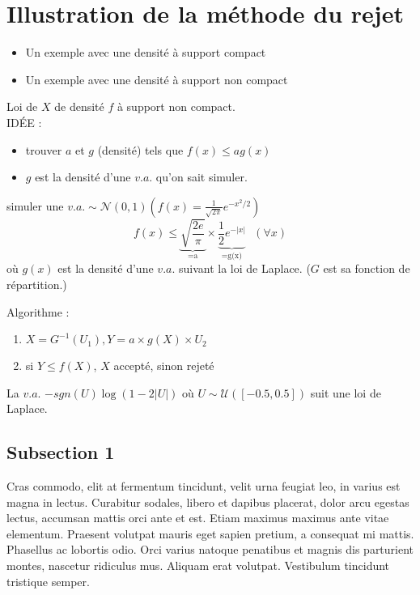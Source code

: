 \section{Illustration de la méthode du rejet}

\begin{itemize}
    \item Un exemple avec une densité à support compact
    \item  Un exemple avec une densité à support non compact
\end{itemize}
Loi de $X$ de densité $f$ à support non compact.\\
\uppercase{Idée :}
\begin{itemize}
    \item trouver $a$ et $g$ (densité) tels que $f(x)\leq ag(x)$
    \item $g$ est la densité d'une $v.a.$ qu'on sait simuler.
\end{itemize}

\begin{example}
    simuler une $v.a. \sim \mathcal{N}(0,1) (f(x)=\frac{1}{\sqrt{2\pi}}e^{-x^2/2})$
    $$f(x)\leq\underbrace{\sqrt{\frac{2e}{\pi}}}_\text{=a} \times
    \underbrace{\frac{1}{2}e^{-|x|}}_\text{=g(x)} \text{   } (\forall x)$$
    où $g(x)$ est la densité d’une $v.a.$ suivant la loi de Laplace.
    ($G$ est sa fonction de répartition.)
\end{example}

Algorithme :
\begin{enumerate}
    \item $X=G^{-1}(U_1), Y=a\times g(X)\times U_{2}$
    \item si $Y\leq f(X)$, $X$ accepté, sinon rejeté
\end{enumerate}
La $v.a.$
$-sgn(U)\log(1-2|U|) \text{  où  } U\sim\mathcal{U}([-0.5,0.5])$
suit une loi de Laplace.














\iffalse

\subsection{Subsection 1}

Cras commodo, elit at fermentum tincidunt, velit urna feugiat leo, in varius est magna in lectus. Curabitur sodales, libero et dapibus placerat, dolor arcu egestas lectus, accumsan mattis orci ante et est. Etiam maximus maximus ante vitae elementum. Praesent volutpat mauris eget sapien pretium, a consequat mi mattis. Phasellus ac lobortis odio. Orci varius natoque penatibus et magnis dis parturient montes, nascetur ridiculus mus. Aliquam erat volutpat. Vestibulum tincidunt tristique semper.

